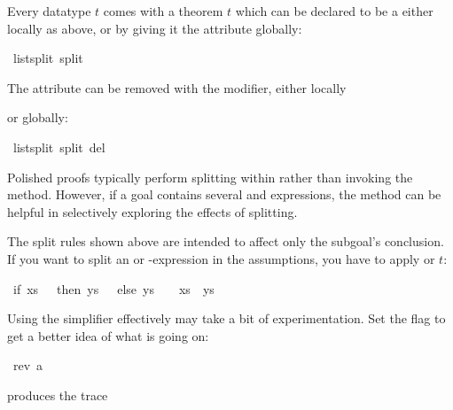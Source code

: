 \begin{isabellebody}
\begin{isamarkuptext}
Every datatype $t$ comes with a theorem
$t$ which can be declared to be a  either
locally as above, or by giving it the  attribute globally:%
\end{isamarkuptext}%
\isamarkuptrue%
\ list{\isachardot}split\ {\isacharbrackleft}split{\isacharbrackright}\isamarkupfalse%
%
\begin{isamarkuptext}%
\noindent
The  attribute can be removed with the  modifier,
either locally%
\end{isamarkuptext}%
\isamarkuptrue%
\isamarkupfalse%
\isamarkupfalse%
\isanewline
\isamarkupfalse%
%
\begin{isamarkuptext}%
\noindent
or globally:%
\end{isamarkuptext}%
\isamarkuptrue%
\ list{\isachardot}split\ {\isacharbrackleft}split\ del{\isacharbrackright}\isamarkupfalse%
%
\begin{isamarkuptext}%
Polished proofs typically perform splitting within  rather than 
invoking the  method.  However, if a goal contains
several  and  expressions, 
the  method can be
helpful in selectively exploring the effects of splitting.

The split rules shown above are intended to affect only the subgoal's
conclusion.  If you want to split an  or -expression
in the assumptions, you have to apply  or
$t$:%
\end{isamarkuptext}%
\isamarkuptrue%
\ {\isachardoublequote}if\ xs\ {\isacharequal}\ {\isacharbrackleft}{\isacharbrackright}\ then\ ys\ {\isasymnoteq}\ {\isacharbrackleft}{\isacharbrackright}\ else\ ys\ {\isacharequal}\ {\isacharbrackleft}{\isacharbrackright}\ {\isasymLongrightarrow}\ xs\ {\isacharat}\ ys\ {\isasymnoteq}\ {\isacharbrackleft}{\isacharbrackright}{\isachardoublequote}\isanewline
\isamarkupfalse%
\isamarkupfalse%
\isamarkuptrue%
\isanewline
\isamarkupfalse%
%
\isamarkuptrue%
%
\begin{isamarkuptext}%
Using the simplifier effectively may take a bit of experimentation.  Set the
 flag 
to get a better idea of what is going
on:%
\end{isamarkuptext}%
\isamarkuptrue%
\isamarkupfalse%
\ {\isachardoublequote}rev\ {\isacharbrackleft}a{\isacharbrackright}\ {\isacharequal}\ {\isacharbrackleft}{\isacharbrackright}{\isachardoublequote}\isanewline
\isamarkupfalse%
\isamarkupfalse%
\isamarkupfalse%
%
\begin{isamarkuptext}%
\noindent
produces the trace


\end{isamarkuptext}
\end{isabellebody}
